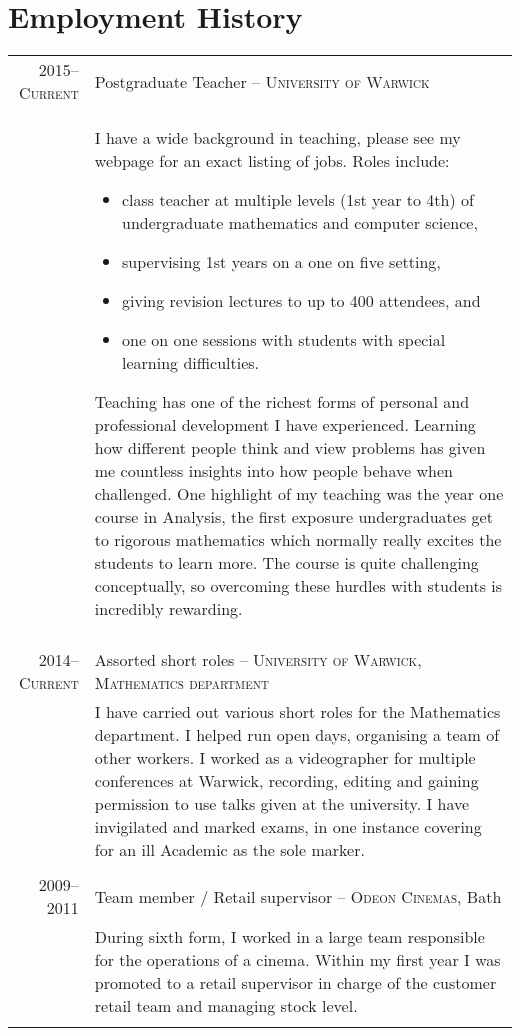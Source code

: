 \documentclass[a4paper,10pt]{article}
\begin{document}
\section{Employment History}
\begin{tabular}{r|p{15cm}}
	\textsc{2015--Current} & Postgraduate Teacher -- \textsc{University of Warwick}\\&\footnotesize{I have a wide background in teaching, please see my webpage for an exact listing of jobs. Roles include:
		\begin{itemize}
			\item class teacher at multiple levels (1st year to 4th) of undergraduate mathematics and computer science,
			\item supervising 1st years on a one on five setting,
			\item giving revision lectures to up to 400 attendees, and
			\item one on one sessions with students with special learning difficulties.
		\end{itemize} 
	Teaching has one of the richest forms of personal and professional development I have experienced. Learning how different people think and view problems has given me countless insights into how people behave when challenged. One highlight of my teaching was the year one course in Analysis, the first exposure undergraduates get to rigorous mathematics which normally really excites the students to learn more. The course is quite challenging conceptually, so overcoming these hurdles with students is incredibly rewarding.}\\\multicolumn{2}{c}{} \\
	\textsc{2014--Current} & Assorted short roles -- \textsc{University of Warwick, Mathematics department}\\&\footnotesize{I have carried out various short roles for the Mathematics department. I helped run open days, organising a team of other workers. I worked as a videographer for multiple conferences at Warwick, recording, editing and gaining permission to use talks given at the university. I have invigilated and marked exams, in one instance covering for an ill Academic as the sole marker.}\\\multicolumn{2}{c}{} \\
	\textsc{2009--2011}& Team member / Retail supervisor -- \textsc{Odeon Cinemas}, Bath\\&\footnotesize{During sixth form, I worked in a large team responsible for the operations of a cinema. Within my first year I was promoted to a retail supervisor in charge of the customer retail team and managing stock level. }\\\multicolumn{2}{c}{} \\
\end{tabular}
\end{document}
